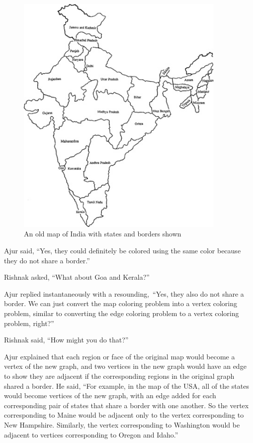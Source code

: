 \begin{figure}
\begin{center}
\includegraphics[width=0.9\textwidth]{MapIndia.jpg}
\end{center}
\caption{An old map of India with states and borders shown}\label{10g10}
\end{figure}

Ajur said, ``Yes, they could definitely be colored using the same color because they do not share a border.''

Rishnak asked, ``What about Goa and Kerala?''

Ajur replied instantaneously with a resounding,~``Yes, they also do not share a border. We can just convert the map coloring problem into a vertex coloring problem, similar to converting the edge coloring problem to a vertex coloring problem, right?''

Rishnak said, ``How might you do that?''

Ajur explained that each region or face of the original map would become a vertex of the new graph, and two vertices in the new graph would have an edge to show they are adjacent if the corresponding regions in the original graph shared a border. He said, ``For example, in the map of the USA, all of the states would become vertices of the new graph, with an edge added for each corresponding pair of states that share a border with one another. So the vertex corresponding to Maine would be adjacent only to the vertex corresponding to New Hampshire. Similarly, the vertex corresponding to Washington would be adjacent to vertices corresponding to Oregon and Idaho.''

